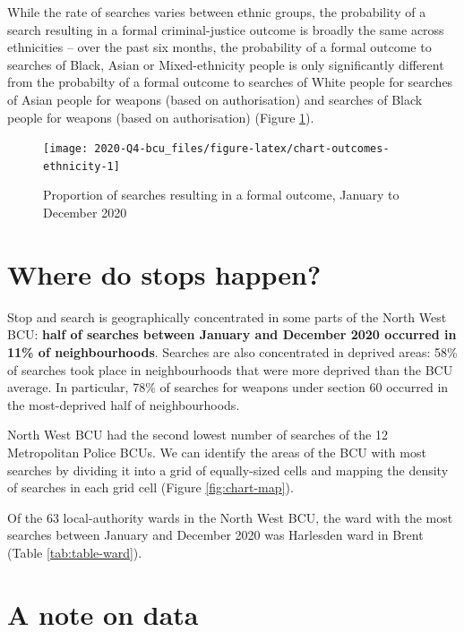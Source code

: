 \documentclass[
  a4paper,
  twoside, 11pt]{article}
\begin{document}
While the rate of searches varies between ethnic groups, the probability of a search resulting in a formal criminal-justice outcome is broadly the same across ethnicities -- over the past six months, the probability of a formal outcome to searches of Black, Asian or Mixed-ethnicity people is only significantly different from the probabilty of a formal outcome to searches of White people for searches of Asian people for weapons (based on authorisation) and searches of Black people for weapons (based on authorisation) (Figure \ref{fig:chart-outcomes-ethnicity}).



\begin{figure}[h]

{\centering \texttt{[image: 2020-Q4-bcu\_files/figure-latex/chart-outcomes-ethnicity-1]} 

}

\caption{Proportion of searches resulting in a formal outcome, January to December 2020}\label{fig:chart-outcomes-ethnicity}
\end{figure}

\hypertarget{where-do-stops-happen}{%
\section{Where do stops happen?}\label{where-do-stops-happen}}

Stop and search is geographically concentrated in some parts of the North West BCU: \textbf{half of searches between January and December 2020 occurred in 11\% of neighbourhoods}. Searches are also concentrated in deprived areas: 58\% of searches took place in neighbourhoods that were more deprived than the BCU average. In particular, 78\% of searches for weapons under section 60 occurred in the most-deprived half of neighbourhoods.

North West BCU had the second lowest number of searches of the 12 Metropolitan Police BCUs. We can identify the areas of the BCU with most searches by dividing it into a grid of equally-sized cells and mapping the density of searches in each grid cell (Figure \ref{fig:chart-map}).

Of the 63 local-authority wards in the North West BCU, the ward with the most searches between January and December 2020 was Harlesden ward in Brent (Table \ref{tab:table-ward}).

\hypertarget{a-note-on-data}{%
\section{A note on data}\label{a-note-on-data}}
\end{document}

